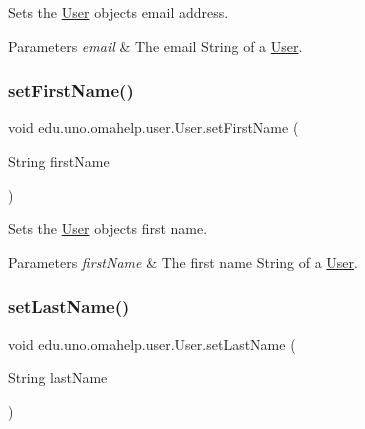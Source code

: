 Sets the \mbox{\hyperlink{classedu_1_1uno_1_1omahelp_1_1user_1_1_user}{User}} object\textquotesingle{}s email address.


\begin{DoxyParams}{Parameters}
{\em email} & The email String of a \mbox{\hyperlink{classedu_1_1uno_1_1omahelp_1_1user_1_1_user}{User}}. \\
\hline
\end{DoxyParams}
\mbox{\label{classedu_1_1uno_1_1omahelp_1_1user_1_1_user_ac5c0877932afe84857910897723a9f46}} 
\subsubsection{\texorpdfstring{set\+First\+Name()}{setFirstName()}}
{\footnotesize\ttfamily void edu.\+uno.\+omahelp.\+user.\+User.\+set\+First\+Name (\begin{DoxyParamCaption}\item[{String}]{first\+Name }\end{DoxyParamCaption})}

Sets the \mbox{\hyperlink{classedu_1_1uno_1_1omahelp_1_1user_1_1_user}{User}} object\textquotesingle{}s first name.


\begin{DoxyParams}{Parameters}
{\em first\+Name} & The first name String of a \mbox{\hyperlink{classedu_1_1uno_1_1omahelp_1_1user_1_1_user}{User}}. \\
\hline
\end{DoxyParams}
\mbox{\label{classedu_1_1uno_1_1omahelp_1_1user_1_1_user_a3dd4bef05ab4ff091637296dba2c860d}} 
\subsubsection{\texorpdfstring{set\+Last\+Name()}{setLastName()}}
{\footnotesize\ttfamily void edu.\+uno.\+omahelp.\+user.\+User.\+set\+Last\+Name (\begin{DoxyParamCaption}\item[{String}]{last\+Name }\end{DoxyParamCaption})}

